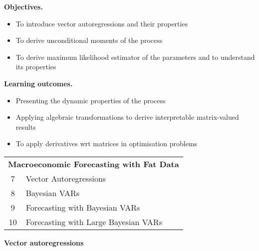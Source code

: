\documentclass[notes,blackandwhite,mathsans,usenames,dvipsnames]{beamer}
\begin{document}
{
\begin{frame}

\bigskip\textbf{\color{mcxs1}Objectives.}
\begin{itemize}[label=$\blacktriangleright$]
\item {\color{mcxs1}To introduce vector autoregressions and their properties}
\item {\color{mcxs1}To derive unconditional moments of the process}
\item {\color{mcxs1}To derive maximum likelihood estimator of the parameters and to understand its properties}
\end{itemize}

\bigskip\textbf{\color{mcxs2}Learning outcomes.}
\begin{itemize}[label=$\blacktriangleright$]
\item {\color{mcxs2}Presenting the dynamic properties of the process}
\item {\color{mcxs2}Applying algebraic transformations to derive interpretable matrix-valued results}
\item {\color{mcxs2}To apply derivatives wrt matrices in optimisation problems}
\end{itemize}

\end{frame}
}





{
\begin{frame}

\centering
\bigskip\begin{tabular}{c l}
\toprule 
\multicolumn{2}{c}{\textbf{Macroeconomic Forecasting with Fat Data}}\\
7  & Vector Autoregressions \\
8  & Bayesian VARs \\
9  & Forecasting with Bayesian VARs \\
10  & Forecasting with Large Bayesian VARs \\[1ex]
\bottomrule
\end{tabular}

\end{frame}
}










{
\begin{frame}

\begin{adjustwidth}{-0.5cm}{0cm}
\vspace{8.3cm}\Large
\textbf{{\color{mcxs2}Vector} {\color{mcxs1}autoregressions}}
\end{adjustwidth}

\end{frame}
}
\end{document}
